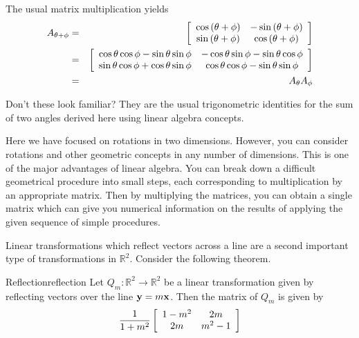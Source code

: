 \begin{solution}
The usual matrix multiplication 
yields
\begin{eqnarray*}
A_{\theta +\phi } &=& \left[
\begin{array}{cc}
\cos \left( \theta +\phi \right) & -\sin \left( \theta +\phi \right) \\
\sin \left( \theta +\phi \right) & \cos \left( \theta +\phi \right)
\end{array}
\right] \\
&=&\left[
\begin{array}{cc}
\cos \theta \cos \phi -\sin \theta \sin \phi & -\cos \theta \sin \phi -\sin
\theta \cos \phi \\
\sin \theta \cos \phi +\cos \theta \sin \phi & \cos \theta \cos \phi -\sin
\theta \sin \phi
\end{array}
\right] \\
&=& A_{\theta }A_{\phi } 
\end{eqnarray*}

Don't these look familiar? They are the usual trigonometric identities for the sum
of two angles derived here using linear algebra concepts.

\end{solution}

Here we have focused on rotations in two dimensions. However, you can consider rotations and
other geometric concepts in any number of dimensions. This is one of the
major advantages of linear algebra. You can break down a difficult
geometrical procedure into small steps, each corresponding to multiplication
by an appropriate matrix. Then by multiplying the matrices, you can obtain a
single matrix which can give you numerical information on the results of
applying the given sequence of simple procedures.


Linear transformations which reflect vectors across a line are a second important type of transformations in $\mathbb{R}^2$. Consider the following theorem.

\begin{theorem}{Reflection}{reflection}
Let $Q_m: \mathbb{R}^2 \to \mathbb{R}^2$ be a linear transformation given by reflecting vectors over the line ${\bf y}=m{\bf x}$. Then the matrix of $Q_m$ is given by 
\[
\frac{1}{1+m^2}
\left[
\begin{array}{cc}
1-m^2 & 2m \\
2m & m^2-1 
\end{array}
\right]
\]
\end{theorem}

